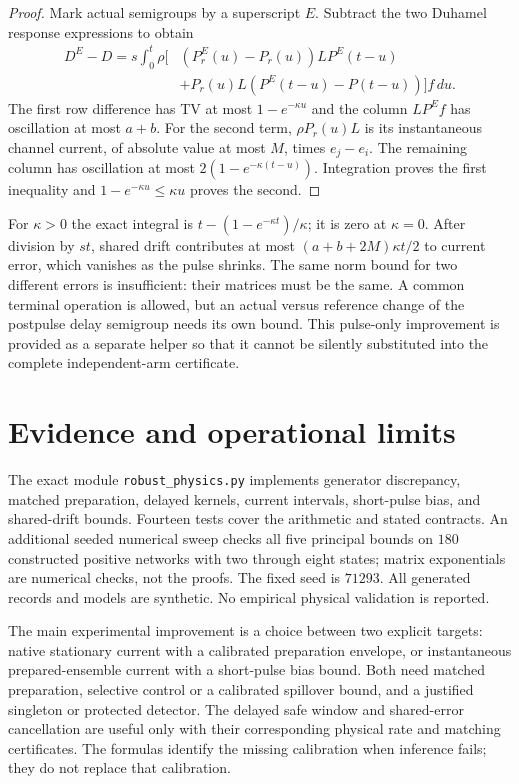 \begin{proof}
Mark actual semigroups by a superscript $E$. Subtract the two Duhamel
response expressions to obtain
\begin{align*}
 D^E-D=s\int_0^t\rho\big[&
 (P_r^E(u)-P_r(u))L P^E(t-u)\\
 &+P_r(u)L(P^E(t-u)-P(t-u))\big]f\,du.
\end{align*}
The first row difference has TV at most $1-e^{-\kappa u}$ and the column
$LP^Ef$ has oscillation at most $a+b$. For the second term,
$\rho P_r(u)L$ is its instantaneous channel current, of absolute value at
most $M$, times $e_j-e_i$. The remaining column has oscillation at most
$2(1-e^{-\kappa(t-u)})$. Integration proves the first inequality and
$1-e^{-\kappa u}\le\kappa u$ proves the second.
\end{proof}

For $\kappa>0$ the exact integral is
$t-(1-e^{-\kappa t})/\kappa$; it is zero at $\kappa=0$. After division
by $st$, shared drift contributes at most
$(a+b+2M)\kappa t/2$ to current error, which vanishes as the pulse shrinks.
The same norm bound for two different errors is insufficient: their matrices
must be the same. A common terminal operation is allowed, but an actual versus
reference change of the postpulse delay semigroup needs its own bound. This
pulse-only improvement is provided as a separate helper so that it cannot be
silently substituted into the complete independent-arm certificate.

\section{Evidence and operational limits}

The exact module \texttt{robust\_physics.py} implements generator discrepancy,
matched preparation, delayed kernels, current intervals, short-pulse bias, and
shared-drift bounds. Fourteen tests cover the arithmetic and stated contracts.
An additional seeded numerical sweep checks all five principal bounds on
$180$ constructed positive networks with two through eight states; matrix
exponentials are numerical checks, not the proofs. The fixed seed is $71293$.
All generated records and models are synthetic. No empirical physical
validation is reported.

The main experimental improvement is a choice between two explicit targets:
native stationary current with a calibrated preparation envelope, or
instantaneous prepared-ensemble current with a short-pulse bias bound. Both
need matched preparation, selective control or a calibrated spillover bound,
and a justified singleton or protected detector. The delayed safe window and
shared-error cancellation are useful only with their corresponding physical
rate and matching certificates. The formulas identify the missing calibration
when inference fails; they do not replace that calibration.
